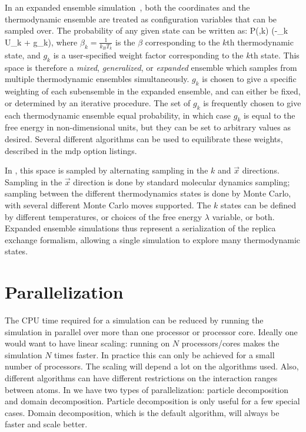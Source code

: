 In an expanded ensemble simulation~\cite{Lyubartsev1992}, both the coordinates and the
thermodynamic ensemble are treated as configuration variables that can
be sampled over.  The probability of any given state can be written as:
\beq
P(,k) \propto \exp\left(-\beta_k U_k + g_k\right),
\eeq
where $\beta_k = \frac{1}{k_B T_k}$ is the $\beta$ corresponding to the $k$th
thermodynamic state, and $g_k$ is a user-specified weight factor corresponding
to the $k$th state.  This space is therefore a {\em mixed}, {\em generalized}, or {\em
  expanded} ensemble which samples from multiple thermodynamic
ensembles simultaneously. $g_k$ is chosen to give a specific weighting
of each subensemble in the expanded ensemble, and can either be fixed,
or determined by an iterative procedure. The set of $g_k$ is
frequently chosen to give each thermodynamic ensemble equal
probability, in which case $g_k$ is equal to the free energy in
non-dimensional units, but they can be set to arbitrary values as
desired.  Several different algorithms can be used to equilibrate
these weights, described in the mdp option listings.

In {\gromacs}, this space is sampled by alternating sampling in the $k$
and $\vec{x}$ directions.  Sampling in the $\vec{x}$ direction is done
by standard molecular dynamics sampling; sampling between the
different thermodynamics states is done by Monte Carlo, with several
different Monte Carlo moves supported. The $k$ states can be defined
by different temperatures, or choices of the free energy $\lambda$
variable, or both.  Expanded ensemble simulations thus represent a
serialization of the replica exchange formalism, allowing a single
simulation to explore many thermodynamic states.



%

\section{Parallelization}
The CPU time required for a simulation can be reduced by running the simulation
in parallel over more than one processor or processor core.
Ideally one would want to have linear scaling: running on $N$ processors/cores
makes the simulation $N$ times faster. In practice this can only be
achieved for a small number of processors. The scaling will depend
a lot on the algorithms used. Also, different algorithms can have different
restrictions on the interaction ranges between atoms.
In {\gromacs} we have two types of parallelization: particle decomposition
and domain decomposition. Particle decomposition is only useful for
a few special cases. Domain decomposition, which is the default algorithm,
will always be faster and scale better.

